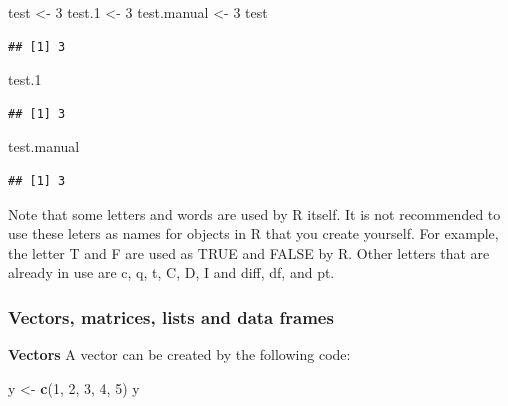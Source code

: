 \documentclass[]{book}
\newenvironment{Shaded}{\begin{snugshade}}{\end{snugshade}}
\newcommand{\KeywordTok}[1]{\textcolor[rgb]{0.13,0.29,0.53}{\textbf{#1}}}
\newcommand{\DecValTok}[1]{\textcolor[rgb]{0.00,0.00,0.81}{#1}}
\newcommand{\StringTok}[1]{\textcolor[rgb]{0.31,0.60,0.02}{#1}}
\newcommand{\NormalTok}[1]{#1}
\theoremstyle{definition}
\theoremstyle{definition}
\theoremstyle{definition}
\theoremstyle{remark}
\begin{document}
\begin{Shaded}
\begin{Highlighting}[]
\NormalTok{test <-}\StringTok{ }\DecValTok{3}
\NormalTok{test.}\DecValTok{1}\NormalTok{ <-}\StringTok{ }\DecValTok{3}
\NormalTok{test.manual <-}\StringTok{ }\DecValTok{3}
\NormalTok{test}
\end{Highlighting}
\end{Shaded}

\begin{verbatim}
## [1] 3
\end{verbatim}

\begin{Shaded}
\begin{Highlighting}[]
\NormalTok{test.}\DecValTok{1}
\end{Highlighting}
\end{Shaded}

\begin{verbatim}
## [1] 3
\end{verbatim}

\begin{Shaded}
\begin{Highlighting}[]
\NormalTok{test.manual }
\end{Highlighting}
\end{Shaded}

\begin{verbatim}
## [1] 3
\end{verbatim}

Note that some letters and words are used by R itself. It is not
recommended to use these leters as names for objects in R that you
create yourself. For example, the letter T and F are used as TRUE and
FALSE by R. Other letters that are already in use are c, q, t, C, D, I
and diff, df, and pt.

\subsubsection{Vectors, matrices, lists and data
frames}\label{vectors-matrices-lists-and-data-frames}

\textbf{Vectors} A vector can be created by the following code:

\begin{Shaded}
\begin{Highlighting}[]
\NormalTok{y <-}\StringTok{ }\KeywordTok{c}\NormalTok{(}\DecValTok{1}\NormalTok{, }\DecValTok{2}\NormalTok{, }\DecValTok{3}\NormalTok{, }\DecValTok{4}\NormalTok{, }\DecValTok{5}\NormalTok{)}
\NormalTok{y}
\end{Highlighting}
\end{Shaded}
\end{document}
